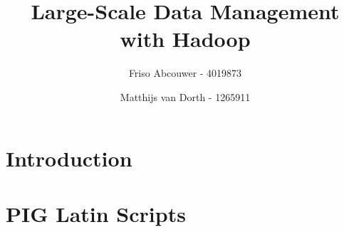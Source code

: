 \documentclass[11pt]{article}
\title{Large-Scale Data Management with Hadoop}
\author{Friso Abcouwer - 4019873 \and Matthijs van Dorth - 1265911}
\begin{document}
\maketitle

\section{Introduction}

\section{PIG Latin Scripts}





\end{document}
